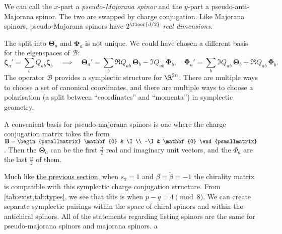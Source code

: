 \documentclass[11pt]{article}
\newcommand{\B}{\mathbf{B}}
\newcommand{\Thetab}{\boldsymbol{\Theta}}
\newcommand{\Phib}{\boldsymbol{\Phi}}
\newcommand{\zetab}{\boldsymbol{\zeta}}
\newcommand{\betat}{\tilde{\beta}}
\begin{document}
We can call the \(x\)-part a \emph{pseudo-Majorana spinor} and the \(y\)-part a pseudo-anti-Majorana spinor.
The two are swapped by charge conjugation.
Like Majorana spinors, pseudo-Majorana spinors have $2^{\floor{d/2}}$ \emph{real dimensions}.

The split into \(\Thetab_a\) and \(\Phib_a\) is not unique.
We could have chosen a different basis for the eigenspaces of \(\mathcal{B}\):
%
\begin{equation*}
  \zetab_a' = \sum_b Q_{ab} \zetab_b
  \quad \implies \quad
  \Thetab_a' = \sum_b \Re Q_{ab}\, \Thetab_b - \Im Q_{ab}\, \Phib_b,
  \quad
  \Phib_a'   = \sum_b \Im Q_{ab}\, \Thetab_b + \Re Q_{ab}\, \Phib_b.
\end{equation*}
%
The operator \(\mathcal{B}\) provides a symplectic structure for \(\R^{2n}\).
There are multiple ways to choose a set of canonical coordinates, and there are multiple ways to choose a polarisation (a split between ``coordinates'' and ``momenta'') in symplectic geometry.

A convenient basis for pseudo-majorana spinors is one where the charge conjugation matrix takes the form 
\( \B = \begin{psmallmatrix}
          \mathbf{0} & \I \\
          -\I & \mathbf{0}
        \end{psmallmatrix}\).
Then the \(\Thetab_a\) can be the first \(\frac{n}{2}\) real and imaginary unit vectors, and the \(\Phi_a\) are the last \(\frac{n}{2}\) of them.

Much like \hyperref[sec:majorana]{the previous section}, when \(s_2 = 1\) and \(\beta = \betat = -1\) the chirality matrix is compatible with this symplectic charge conjugation structure.
From \cref{tab:exist,tab:types}, we see that this is when \( p-q = 4 \pmod 8 \).
We can create separate symplectic pairings within the space of chiral spinors and within the antichiral spinors.
All of the statements regarding listing spinors are the same for pseudo-majorana spinors and majorana spinors.
a
\end{document}
